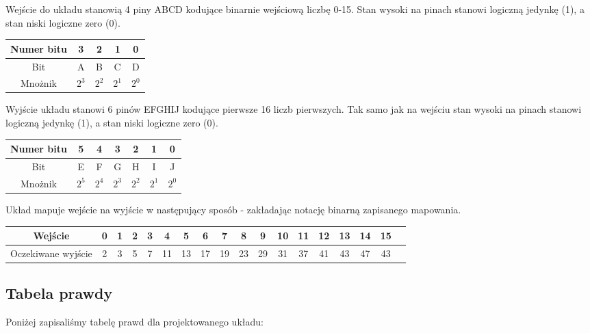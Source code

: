 \documentclass[a4paper]{article}
\begin{document}
Wejście do układu stanowią 4 piny ABCD kodujące binarnie wejściową liczbę 0-15. Stan wysoki na pinach
stanowi logiczną jedynkę (1), a stan niski logiczne zero (0).
\begin{center}
  \begin{tabular}{|c|c|c|c|c|}
    \hline Numer bitu & 3 & 2 & 1 & 0 \\ 
    \hline Bit & A & B & C & D \\
    \hline Mnożnik & $2^3$ & $2^2$ & $2^1$ & $2^0$  \\
    \hline
  \end{tabular}
\end{center}

Wyjście układu stanowi 6 pinów EFGHIJ kodujące pierwsze 16 liczb pierwszych. Tak samo jak na wejściu stan wysoki na pinach
stanowi logiczną jedynkę (1), a stan niski logiczne zero (0). 
\begin{center}
  \begin{tabular}{|c|c|c|c|c|c|c|}
    \hline Numer bitu & 5 & 4 & 3 & 2 & 1 & 0 \\ 
    \hline Bit & E & F & G & H & I & J \\
    \hline Mnożnik & $2^5$ & $2^4$ & $2^3$ & $2^2$ & $2^1$ & $2^0$ \\
    \hline
  \end{tabular}
\end{center}

Układ mapuje wejście na wyjście w następujący sposób - zakładając notację binarną zapisanego mapowania.

\begin{center}
  \begin{tabular}{|c|c|c|c|c|c|c|c|c|c|c|c|c|c|c|c|c|c|}
    \hline Wejście            & 0 & 1 & 2 & 3 & 4  & 5 & 6 & 7 & 8 & 9 & 10 & 11 & 12 & 13 & 14 & 15 \\ 
    \hline Oczekiwane wyjście & 2 & 3 & 5 & 7 & 11 & 13 & 17 & 19 & 23 & 29 & 31 & 37 & 41 & 43 & 47 & 43 \\ 
    \hline
  \end{tabular}
\end{center}

\subsection{Tabela prawdy}
Poniżej zapisaliśmy tabelę prawd dla projektowanego układu:
\end{document}
